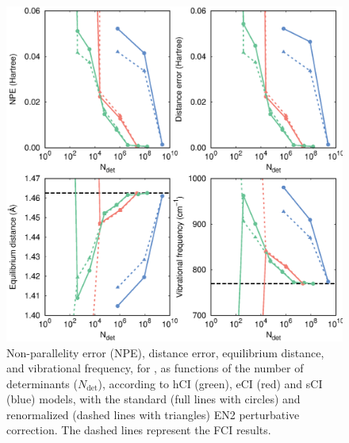 \documentclass[aip,jcp,preprint,noshowkeys,superscriptaddress]{revtex4-1}
\newcommand{\Ndet}{N_\text{det}}
\begin{document}
\begin{figure}%
\includegraphics[width=1.0\linewidth]{plot_pt2_rpt2_F2}
\caption{
Non-parallelity error (NPE), distance error, equilibrium distance, and vibrational frequency, for ,
as functions of the number of determinants ($\Ndet$), according to hCI (green), eCI (red) and sCI (blue) models,
with the standard (full lines with circles) and renormalized (dashed lines with triangles) EN2 perturbative correction.
The dashed lines represent the FCI results.}
\label{fig:plot_pt2_rpt2_f2}
\end{figure}
\end{document}
